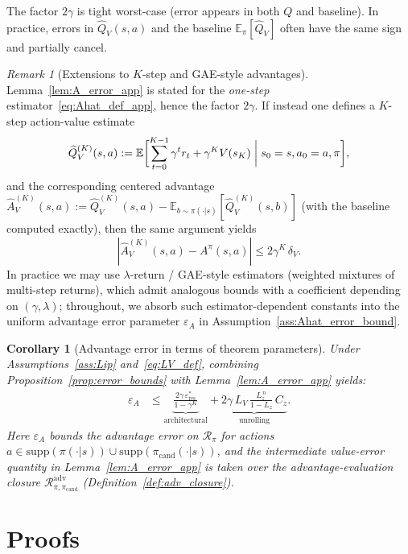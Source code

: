\documentclass{article}
\theoremstyle{plain}
\newtheorem{corollary}[theorem]{Corollary}
\theoremstyle{definition}
\theoremstyle{remark}
\newtheorem{remark}[theorem]{Remark}
\newcommand{\E}{\mathbb{E}}
\begin{document}
The factor $2\gamma$ is tight worst-case (error appears in both $Q$ and baseline).
In practice, errors in $\widehat Q_V(s,a)$ and the baseline $\E_\pi[\widehat Q_V]$ often have the same sign and partially cancel.
\begin{remark}[Extensions to $K$-step and GAE-style advantages]
\label{rem:A_error_kstep_app}
Lemma~\ref{lem:A_error_app} is stated for the \emph{one-step} estimator~\eqref{eq:Ahat_def_app}, hence the factor $2\gamma$.
If instead one defines a $K$-step action-value estimate
\begin{equation*}
\widehat Q_V^{(K)}(s,a) :=
\E\biggl[\sum_{t=0}^{K-1}\gamma^t r_t + \gamma^K V(s_K) \biggm| s_0=s, a_0=a, \pi\biggr],
\end{equation*}
and the corresponding centered advantage
$\widehat A_V^{(K)}(s,a):=\widehat Q_V^{(K)}(s,a)-\E_{b\sim\pi(\cdot|s)}[\widehat Q_V^{(K)}(s,b)]$
(with the baseline computed exactly), then the same argument yields
\[
|\widehat A_V^{(K)}(s,a)-A^\pi(s,a)| \le 2\gamma^K\,\delta_V.
\]
In practice we may use $\lambda$-return / GAE-style estimators (weighted mixtures of multi-step returns), which admit analogous bounds with a coefficient depending on $(\gamma,\lambda)$; throughout, we absorb such estimator-dependent constants into the uniform advantage error parameter $\varepsilon_A$ in Assumption~\ref{ass:Ahat_error_bound}.
\end{remark}

\begin{corollary}[Advantage error in terms of theorem parameters]
\label{cor:epsA_dials_app}
Under Assumptions~\ref{ass:Lip} and~\eqref{eq:LV_def}, combining Proposition~\ref{prop:error_bounds} with Lemma~\ref{lem:A_error_app} yields:
\begin{align}
\varepsilon_A
&\le
\underbrace{\frac{2\gamma\,\varepsilon_{\mathrm{res}}^*}{1-\gamma^K}}_{\text{architectural}}
+
\underbrace{2\gamma\,L_V\,\frac{L_z^{\,n}}{1-L_z}\,C_z}_{\text{unrolling}}.
\label{eq:epsA_dials_app}
\end{align}
Here $\varepsilon_A$ bounds the advantage error on $\mathcal{R}_\pi$ for actions
$a\in \mathrm{supp}(\pi(\cdot|s))\cup\mathrm{supp}(\pi_{\mathrm{cand}}(\cdot|s))$,
and the intermediate value-error quantity in Lemma~\ref{lem:A_error_app} is taken over the advantage-evaluation closure $\mathcal{R}_{\pi,\pi_{\mathrm{cand}}}^{\mathrm{adv}}$ (Definition~\ref{def:adv_closure}).
\end{corollary}

\section{Proofs}
\label{app:proofs}
\end{document}
